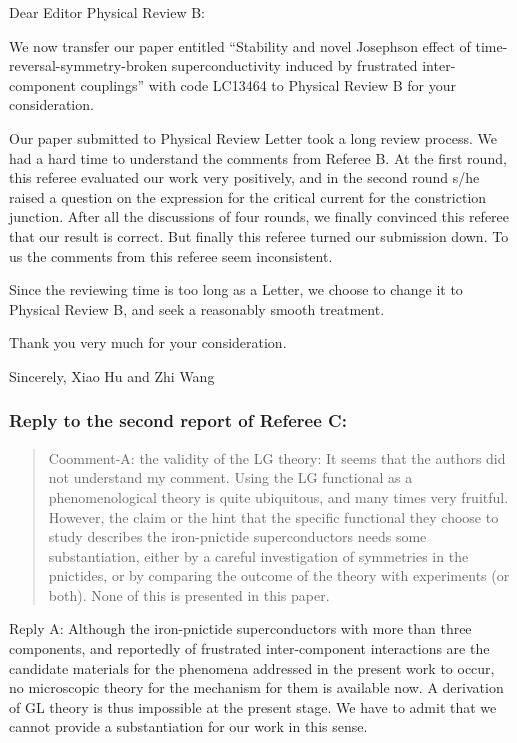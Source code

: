 \documentclass[11pt]{article}
\begin{document}
Dear Editor Physical Review B:

We now transfer our paper entitled ``Stability and novel Josephson
effect of time-reversal-symmetry-broken superconductivity induced by
frustrated inter-component couplings'' with code LC13464 to Physical
Review B for your consideration.

Our paper submitted to Physical Review Letter took a long review
process. We had a hard time to understand the comments from Referee B.
At the first round, this referee evaluated our work very positively, and
in the second round s/he raised a question on the expression for the
critical current for the constriction junction. After all the
discussions of four rounds, we finally convinced this referee that our
result is correct. But finally this referee turned our submission down.
To us the comments from this referee seem inconsistent.

Since the reviewing time is too long as a Letter, we choose to change it
to Physical Review B, and seek a reasonably smooth treatment.

Thank you very much for your consideration.

Sincerely, Xiao Hu and Zhi Wang

\hypertarget{reply-to-the-second-report-of-referee-c}{%
\subsubsection{Reply to the second report of Referee
C:}\label{reply-to-the-second-report-of-referee-c}}

\begin{quote}
Coomment-A: the validity of the LG theory: It seems that the authors did
not understand my comment. Using the LG functional as a phenomenological
theory is quite ubiquitous, and many times very fruitful. However, the
claim or the hint that the specific functional they choose to study
describes the iron-pnictide superconductors needs some substantiation,
either by a careful investigation of symmetries in the pnictides, or by
comparing the outcome of the theory with experiments (or both). None of
this is presented in this paper.
\end{quote}

Reply A: Although the iron-pnictide superconductors with more than three
components, and reportedly of frustrated inter-component interactions
are the candidate materials for the phenomena addressed in the present
work to occur, no microscopic theory for the mechanism for them is
available now. A derivation of GL theory is thus impossible at the
present stage. We have to admit that we cannot provide a substantiation
for our work in this sense.
\end{document}
